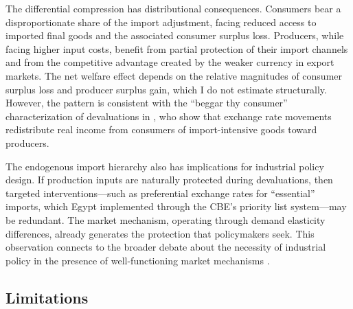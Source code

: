 \documentclass[12pt]{article}
\begin{document}
The differential compression has distributional consequences. Consumers bear a disproportionate share of the import adjustment, facing reduced access to imported final goods and the associated consumer surplus loss. Producers, while facing higher input costs, benefit from partial protection of their import channels and from the competitive advantage created by the weaker currency in export markets. The net welfare effect depends on the relative magnitudes of consumer surplus loss and producer surplus gain, which I do not estimate structurally. However, the pattern is consistent with the ``beggar thy consumer'' characterization of devaluations in \citet{cravino2017deflating}, who show that exchange rate movements redistribute real income from consumers of import-intensive goods toward producers.

The endogenous import hierarchy also has implications for industrial policy design. If production inputs are naturally protected during devaluations, then targeted interventions---such as preferential exchange rates for ``essential'' imports, which Egypt implemented through the CBE's priority list system---may be redundant. The market mechanism, operating through demand elasticity differences, already generates the protection that policymakers seek. This observation connects to the broader debate about the necessity of industrial policy in the presence of well-functioning market mechanisms \citep{harrison2014policy}.

\subsection{Limitations}
\end{document}
